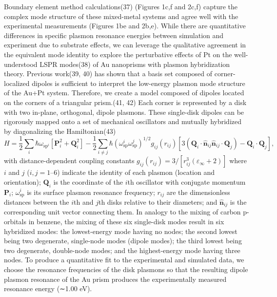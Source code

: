 \documentclass [11pt, proquest] {uwthesis}[2016/11/22]
\begin{document}
Boundary element method calculations(37) (Figures 1c,f and 2c,f) capture the complex mode structure of these mixed-metal systems and agree well with the experimental measurements (Figures 1be and 2b,e). While there are quantitative differences in specific plasmon resonance energies between simulation and experiment due to substrate effects, we can leverage the qualitative agreement in the equivalent mode identity to explore the perturbative effects of Pt on the well-understood LSPR modes(38) of Au nanoprisms with plasmon hybridization theory. Previous work(39, 40) has shown that a basis set composed of corner-localized dipoles is sufficient to interpret the low-energy plasmon mode structure of the Au+Pt system. Therefore, we create a model composed of dipoles located on the corners of a triangular prism.(41, 42) Each corner is represented by a disk with two in-plane, orthogonal, dipole plasmons. These single-disk dipoles can be rigorously mapped onto a set of mechanical oscillators and mutually hybridized by diagonalizing the Hamiltonian(43)
\begin{equation}
H = \frac{1}{2}\sum_{i}\hbar\omega_{\textrm{sp}^i}[\textbf{P}_i^2 + \textbf{Q}_i^2] - \frac{1}{2}\sum_{i \neq j}\hbar(\omega_{\textrm{sp}}^i\omega_{\textrm{sp}}^j)^{1/2}g_{ij}(r_{ij})[3(\textbf{Q}_i\cdot\hat{\textbf{n}}_{ij}\hat{\textbf{n}}_{ij}\cdot\textbf{Q}_j)-\textbf{Q}_i\cdot\textbf{Q}_j],
\label{prism_hammy}
\end{equation}
with distance-dependent coupling constants $g_{ij}(r_{ij}) = 3/[r_{ij}^3(\varepsilon_{\infty} + 2)]$ where $i$ and $j$ ($i, j = 1–6$) indicate the identity of each plasmon (location and orientation); $\textbf{Q}_i$ is the coordinate of the $i$th oscillator with conjugate momentum $\textbf{P}_i$; $\omega_{\textrm{sp}}^i$ is its surface plasmon resonance frequency; $r_{ij}$ are the dimensionless distances between the $i$th and $j$th disks relative to their diameters; and $\hat{\textbf{n}}_{ij}$ is the corresponding unit vector connecting them.
In analogy to the mixing of carbon p-orbitals in benzene, the mixing of these six single-disk modes result in six hybridized modes: the lowest-energy mode having no nodes; the second lowest being two degenerate, single-node modes (dipole modes); the third lowest being two degenerate, double-node modes; and the highest-energy mode having three nodes. To produce a quantitative fit to the experimental and simulated data, we choose the resonance frequencies of the disk plasmons so that the resulting dipole plasmon resonance of the Au prism produces the experimentally measured resonance energy (∼1.00 eV).
\end{document}
